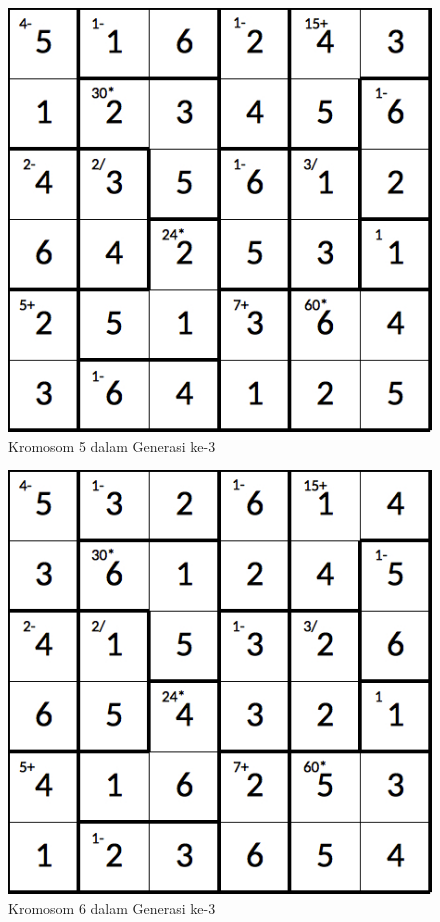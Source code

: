 \begin{figure}
\centering
\captionsetup{justification=centering}
\includegraphics[scale=0.333]{Gambar/hybridgenetic/Generation3Chromosome5}
\caption[Kromosom 5 dalam Generasi ke-3]{Kromosom 5 dalam Generasi ke-3}
\label{fig:analisisg3k5}
\end{figure}

\begin{figure}
\centering
\captionsetup{justification=centering}
\includegraphics[scale=0.333]{Gambar/hybridgenetic/Generation3Chromosome6}
\caption[Kromosom 6 dalam Generasi ke-3]{Kromosom 6 dalam Generasi ke-3}
\label{fig:analisisg3k6}
\end{figure}


